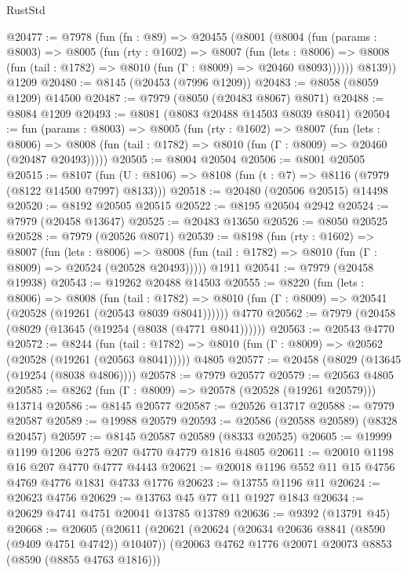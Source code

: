 \begin{lexlean}{RustStd}
\begin{coremodule}
@20477 := @7978
    (fun (fn : @89) =>
    @20455
      (@8001
        (@8004
          (fun (params : @8003) =>
          @8005
            (fun (rty : @1602) =>
            @8007
              (fun (lets : @8006) =>
              @8008 (fun (tail : @1782) => @8010 (fun (Γ : @8009) => @20460 @8093))))))
        @8139))
    @1209
@20480 := @8145 (@20453 (@7996 @1209))
@20483 := @8058 (@8059 @1209) @14500
@20487 := @7979 (@8050 (@20483 @8067) @8071)
@20488 := @8084 @1209
@20493 := @8081 (@8083 @20488 @14503 @8039 @8041)
@20504 := fun (params : @8003) =>
  @8005
    (fun (rty : @1602) =>
    @8007
      (fun (lets : @8006) =>
      @8008 (fun (tail : @1782) => @8010 (fun (Γ : @8009) => @20460 (@20487 @20493)))))
@20505 := @8004 @20504
@20506 := @8001 @20505
@20515 := @8107
    (fun (U : @8106) => @8108 (fun (t : @7) => @8116 (@7979 (@8122 @14500 @7997) @8133)))
@20518 := @20480 (@20506 @20515) @14498
@20520 := @8192 @20505 @20515
@20522 := @8195 @20504 @2942
@20524 := @7979 (@20458 @13647)
@20525 := @20483 @13650
@20526 := @8050 @20525
@20528 := @7979 (@20526 @8071)
@20539 := @8198
    (fun (rty : @1602) =>
    @8007
      (fun (lets : @8006) =>
      @8008 (fun (tail : @1782) => @8010 (fun (Γ : @8009) => @20524 (@20528 @20493)))))
    @1911
@20541 := @7979 (@20458 @19938)
@20543 := @19262 @20488 @14503
@20555 := @8220
    (fun (lets : @8006) =>
    @8008
      (fun (tail : @1782) =>
      @8010 (fun (Γ : @8009) => @20541 (@20528 (@19261 (@20543 @8039 @8041))))))
    @4770
@20562 := @7979 (@20458 (@8029 (@13645 (@19254 (@8038 (@4771 @8041))))))
@20563 := @20543 @4770
@20572 := @8244
    (fun (tail : @1782) => @8010 (fun (Γ : @8009) => @20562 (@20528 (@19261 (@20563 @8041)))))
    @4805
@20577 := @20458 (@8029 (@13645 (@19254 (@8038 @4806))))
@20578 := @7979 @20577
@20579 := @20563 @4805
@20585 := @8262 (fun (Γ : @8009) => @20578 (@20528 (@19261 @20579))) @13714
@20586 := @8145 @20577
@20587 := @20526 @13717
@20588 := @7979 @20587
@20589 := @19988 @20579
@20593 := @20586 (@20588 @20589) (@8328 @20457)
@20597 := @8145 @20587 @20589 (@8333 @20525)
@20605 := @19999 @1199 @1206 @275 @207 @4770 @4779 @1816 @4805
@20611 := @20010 @1198 @16 @207 @4770 @4777 @4443
@20621 := @20018 @1196 @552 @11 @15 @4756 @4769 @4776 @1831 @4733 @1776
@20623 := @13755 @1196 @11
@20624 := @20623 @4756
@20629 := @13763 @45 @77 @11 @1927 @1843
@20634 := @20629 @4741 @4751 @20041 @13785 @13789
@20636 := @9392 (@13791 @45)
@20668 := @20605
    (@20611
      (@20621
        (@20624 (@20634 @20636 @8841 (@8590 (@9409 @4751 @4742)) @10407))
        (@20063 @4762 @1776 @20071 @20073 @8853 (@8590 (@8855 @4763 @1816)))

\end{coremodule}
\end{lexlean}
